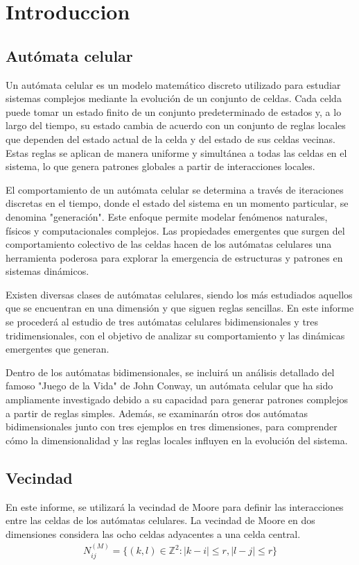 \section{Introduccion}
\label{sec:intro}

\subsection{Autómata celular}

Un autómata celular es un modelo matemático discreto utilizado para estudiar sistemas complejos mediante la evolución de un conjunto de celdas.
Cada celda puede tomar un estado finito de un conjunto predeterminado de estados y, a lo largo del tiempo, su estado cambia de acuerdo con un conjunto de reglas locales que dependen del estado actual de la celda y del estado de sus celdas vecinas.
Estas reglas se aplican de manera uniforme y simultánea a todas las celdas en el sistema, lo que genera patrones globales a partir de interacciones locales.

El comportamiento de un autómata celular se determina a través de iteraciones discretas en el tiempo, donde el estado del sistema en un momento particular, se denomina "generación".
Este enfoque permite modelar fenómenos naturales, físicos y computacionales complejos.
Las propiedades emergentes que surgen del comportamiento colectivo de las celdas hacen de los autómatas celulares una herramienta poderosa para explorar la emergencia de estructuras y patrones en sistemas dinámicos.

Existen diversas clases de autómatas celulares, siendo los más estudiados aquellos que se encuentran en una dimensión y que siguen reglas sencillas.
En este informe se procederá al estudio de tres autómatas celulares bidimensionales y tres tridimensionales, con el objetivo de analizar su comportamiento y las dinámicas emergentes que generan.

Dentro de los autómatas bidimensionales, se incluirá un análisis detallado del famoso "Juego de la Vida" de John Conway, un autómata celular que ha sido ampliamente investigado debido a su capacidad para generar patrones complejos a partir de reglas simples.
Además, se examinarán otros dos autómatas bidimensionales junto con tres ejemplos en tres dimensiones, para comprender cómo la dimensionalidad y las reglas locales influyen en la evolución del sistema.

\subsection{Vecindad}
En este informe, se utilizará la vecindad de Moore para definir las interacciones entre las celdas de los autómatas celulares.
La vecindad de Moore en dos dimensiones considera las ocho celdas adyacentes a una celda central.
\begin{equation}
    \label{eq:moore_neighborhood}
    \begin{aligned}
        N^{(M)}_{ij} = \{(k,l) \in \mathbb{Z}^2 : |k-i| \leq r, |l-j| \leq r\}
    \end{aligned}
\end{equation}

